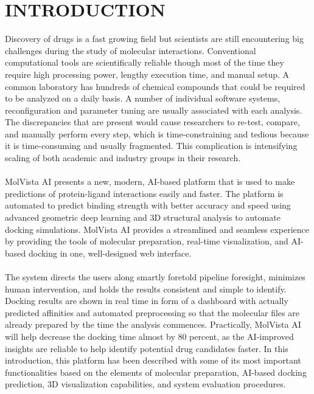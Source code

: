 \documentclass[12pt,a4]{report}
\begin{document}
\chapter{INTRODUCTION}
\hspace*{0.3in}Discovery of drugs is a fast growing field but scientists are still encountering big challenges during the study of molecular interactions. Conventional computational tools are scientifically reliable though most of the time they require high processing power, lengthy execution time, and manual setup. A common laboratory has hundreds of chemical compounds that could be required to be analyzed on a daily basis. A number of individual software systems, reconfiguration and parameter tuning are usually associated with each analysis. The discrepancies that are present would cause researchers to re-test, compare, and manually perform every step, which is time-constraining and tedious because it is time-consuming and usually fragmented. This complication is intensifying scaling of both academic and industry groups in their research.
\\\\
\hspace*{0.3in}MolVista AI presents a new, modern, AI-based platform that is used to make predictions of protein-ligand interactions easily and faster. The platform is automated to predict binding strength with better accuracy and speed using advanced geometric deep learning and 3D structural analysis to automate docking simulations. MolVista AI provides a streamlined and seamless experience by providing the tools of molecular preparation, real-time visualization, and AI-based docking in one, well-designed web interface.
\\\\
\hspace*{0.3in}The system directs the users along smartly foretold pipeline foresight, minimizes human intervention, and holds the results consistent and simple to identify. Docking results are shown in real time in form of a dashboard with actually predicted affinities and automated preprocessing so that the molecular files are already prepared by the time the analysis commences. Practically, MolVista AI will help decrease the docking time almost by 80 percent, as the AI-improved insights are reliable to help identify potential drug candidates faster. In this introduction, this platform has been described with some of its most important functionalities based on the elements of molecular preparation, AI-based docking prediction, 3D visualization capabilities, and system evaluation procedures.\\\\
\end{document}
